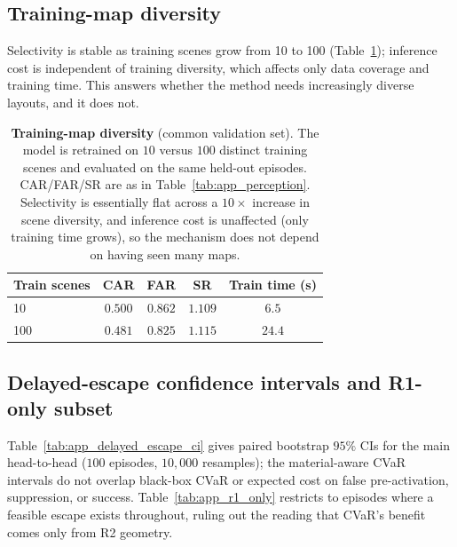 \subsection{Training-map diversity}
\label{app:map_diversity}
Selectivity is stable as training scenes grow from 10 to 100
(Table~\ref{tab:app_mapdiv}); inference cost is independent of training
diversity, which affects only data coverage and training time. This answers
whether the method needs increasingly diverse layouts, and it does not.

\begin{table}[htbp]
\centering
\caption{\textbf{Training-map diversity} (common validation set). The model is
retrained on $10$ versus $100$ distinct training scenes and evaluated on the
same held-out episodes. CAR/FAR/SR are as in Table~\ref{tab:app_perception}.
Selectivity is essentially flat across a $10\times$ increase in scene
diversity, and inference cost is unaffected (only training time grows), so the
mechanism does not depend on having seen many maps.}
\label{tab:app_mapdiv}
\small\setlength{\tabcolsep}{7pt}\renewcommand{\arraystretch}{1.1}
\begin{tabular}{lcccc}
\toprule
Train scenes & CAR & FAR & SR & Train time (s) \\
\midrule
10  & $0.500$ & $0.862$ & $1.109$ & $6.5$ \\
100 & $0.481$ & $0.825$ & $1.115$ & $24.4$ \\
\bottomrule
\end{tabular}
\end{table}


\subsection{Delayed-escape confidence intervals and R1-only subset}
\label{app:delayed_ci}
Table~\ref{tab:app_delayed_escape_ci} gives paired bootstrap $95\%$ CIs for the
main head-to-head ($100$ episodes, $10{,}000$ resamples); the material-aware
CVaR intervals do not overlap black-box CVaR or expected cost on false
pre-activation, suppression, or success. Table~\ref{tab:app_r1_only} restricts
to episodes where a feasible escape exists throughout, ruling out the reading
that CVaR's benefit comes only from R2 geometry.

